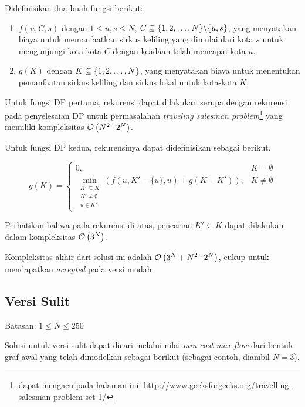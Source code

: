\documentclass[../main_editorial.tex]{subfiles} %
\begin{document}
Didefinisikan dua buah fungsi berikut:

\begin{enumerate}
	\item $ f(u, C, s) $ dengan $ 1 \le u, s \le N $, $ C \subseteq \{1, 2, \mathellipsis, N\} \backslash \{u, s\} $, yang menyatakan biaya untuk memanfaatkan sirkus keliling yang dimulai dari kota $ s $ untuk mengunjungi kota-kota $ C $ dengan keadaan telah mencapai kota $ u $.
	\item $ g(K) $ dengan $ K \subseteq \{1, 2, \mathellipsis, N\} $, yang menyatakan biaya untuk menentukan pemanfaatan sirkus keliling dan sirkus lokal untuk kota-kota $ K $.
\end{enumerate}

Untuk fungsi DP pertama, rekurensi dapat dilakukan serupa dengan rekurensi pada penyelesaian DP untuk permasalahan \textit{traveling salesman problem}\footnote{dapat mengacu pada halaman ini: \href{http://www.geeksforgeeks.org/travelling-salesman-problem-set-1/}{http://www.geeksforgeeks.org/travelling-salesman-problem-set-1/}} yang memiliki kompleksitas $ \mathcal{O}\left( N^2 \cdot 2^N \right) $.

Untuk fungsi DP kedua, rekurensinya dapat didefinisikan sebagai berikut.

$$
g(K) = 
\begin{cases}
	0, & K = \emptyset \\
	\displaystyle \min_{\substack{K'\subseteq K \\ K' \neq \emptyset \\ u \in K'}}{\left(f\left(u, K' - \{u\}, u\right) + g\left(K - K'\right)\right)}, & K \neq \emptyset
\end{cases}
$$

Perhatikan bahwa pada rekurensi di atas, pencarian $ K' \subseteq K $ dapat dilakukan dalam kompleksitas $ \mathcal{O}\left( 3^N \right) $.

Kompleksitas akhir dari solusi ini adalah $ \mathcal{O}\left( 3^N + N^2 \cdot 2^N \right) $, cukup untuk mendapatkan \textit{accepted} pada versi mudah.

\pagebreak

\subsection*{Versi Sulit}
Batasan: $ 1 \le N \le 250 $

Solusi untuk versi sulit dapat dicari melalui nilai \textit{min-cost max flow} dari bentuk graf awal yang telah dimodelkan sebagai berikut (sebagai contoh, diambil $ N = 3 $).
\end{document}
